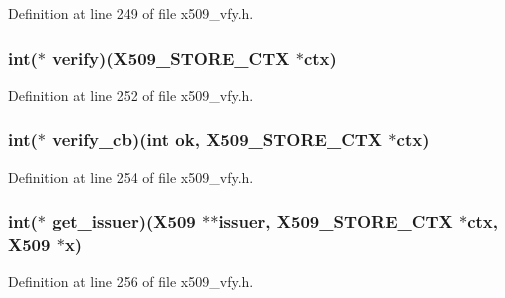 Definition at line 249 of file x509\+\_\+vfy.\+h.

\subsubsection[{\texorpdfstring{verify}{verify}}]{\setlength{\rightskip}{0pt plus 5cm}int($\ast$ verify)({\bf X509\+\_\+\+S\+T\+O\+R\+E\+\_\+\+C\+TX} $\ast${\bf ctx})}\hypertarget{structx509__store__ctx__st_ac3a2bd38c545830a826a7d26031473d1}{}\label{structx509__store__ctx__st_ac3a2bd38c545830a826a7d26031473d1}


Definition at line 252 of file x509\+\_\+vfy.\+h.

\subsubsection[{\texorpdfstring{verify\+\_\+cb}{verify_cb}}]{\setlength{\rightskip}{0pt plus 5cm}int($\ast$ verify\+\_\+cb)(int ok, {\bf X509\+\_\+\+S\+T\+O\+R\+E\+\_\+\+C\+TX} $\ast${\bf ctx})}\hypertarget{structx509__store__ctx__st_a7a498a0e2b66a935922a642eeebfc183}{}\label{structx509__store__ctx__st_a7a498a0e2b66a935922a642eeebfc183}


Definition at line 254 of file x509\+\_\+vfy.\+h.

\subsubsection[{\texorpdfstring{get\+\_\+issuer}{get_issuer}}]{\setlength{\rightskip}{0pt plus 5cm}int($\ast$ get\+\_\+issuer)({\bf X509} $\ast$$\ast$issuer, {\bf X509\+\_\+\+S\+T\+O\+R\+E\+\_\+\+C\+TX} $\ast${\bf ctx}, {\bf X509} $\ast${\bf x})}\hypertarget{structx509__store__ctx__st_ac4f2db1b4c777ae1a8e1825848e6544c}{}\label{structx509__store__ctx__st_ac4f2db1b4c777ae1a8e1825848e6544c}


Definition at line 256 of file x509\+\_\+vfy.\+h.

